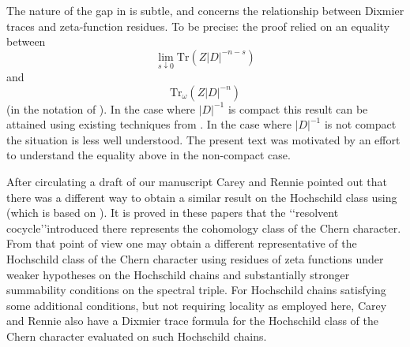     The nature of the gap in \cite{higson} is subtle, and concerns the relationship between Dixmier traces and zeta-function residues. To be precise: the proof
     relied on an equality between
     \begin{equation*}
	\lim_{s\downarrow 0} \mathrm{Tr}(Z|D|^{-n-s})
     \end{equation*}
     and
     \begin{equation*}
	\mathrm{Tr}_\omega(Z|D|^{-n})
     \end{equation*}
     (in the notation of \cite{higson}). In the case where $|D|^{-1}$ is compact this result can be attained using
     existing techniques from \cite[Theorem 8.6.4, Theorem 8.6.5 and Theorem 9.3.1]{LSZ}. In the case where $|D|^{-1}$ is not compact the situation
     is less well understood. The present text was motivated by an effort to understand the equality above in the non-compact case.
    
    {
    After circulating a draft of our manuscript Carey and Rennie pointed out that there was a different way to obtain a similar result on the Hochschild class using \cite{CGRS2} (which is based on \cite{CPRS4}). It is proved in these papers that the \lq\lq resolvent cocycle\rq\rq introduced there represents the cohomology class of the Chern character. From that point of view one may obtain a different representative of the Hochschild class of the Chern character using  residues of zeta functions under weaker hypotheses on the Hochschild chains and substantially stronger summability conditions on the spectral triple. For Hochschild chains satisfying some additional conditions, but not requiring locality as employed here, Carey and Rennie also have a Dixmier trace formula for the Hochschild class of the Chern character evaluated on such Hochschild chains. }
    
